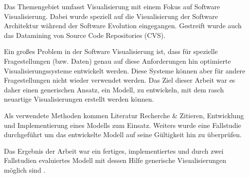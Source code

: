 
 Das Themengebiet umfasst Visualisierung mit einem Fokus
auf Software Visualisierung. Dabei wurde speziell auf die Visualisierung der
Software Architektur während der Software Evolution eingegangen. Gestreift
wurde auch das Datamining von Source Code Repositories
(CVS)\cite[Kap.~1]{Breier2008}.

 Ein großes Problem in der Software Visualisierung
ist, dass für spezielle Fragestellungen (bzw. Daten) genau auf diese
Anforderungen hin optimierte Visualisierungssysteme entwickelt werden. Diese
Systeme können aber für andere Fragestellungen nicht wieder verwendet werden.
Das Ziel dieser Arbeit war es daher einen generischen Ansatz, ein Modell, zu
entwickeln, mit dem rasch neuartige Visualisierungen erstellt werden
können\cite[Kap.~1.1]{Breier2008}.

 Als verwendete Methoden kommen Literatur
Recherche \& Zitieren, Entwicklung und Implementierung eines Modells zum
Einsatz. Weiters wurde eine Fallstudie durchgeführt um das entwickelte Modell
auf seine Gültigkeit hin zu überprüfen\cite[Kap.~3--6]{Breier2008}.

 Das Ergebnis der Arbeit war ein fertiges, implementiertes
und durch zwei Fallstudien evaluiertes Modell mit dessen Hilfe generische
Visualisierungen möglich sind \cite[Kap.~7]{Breier2008}. 

